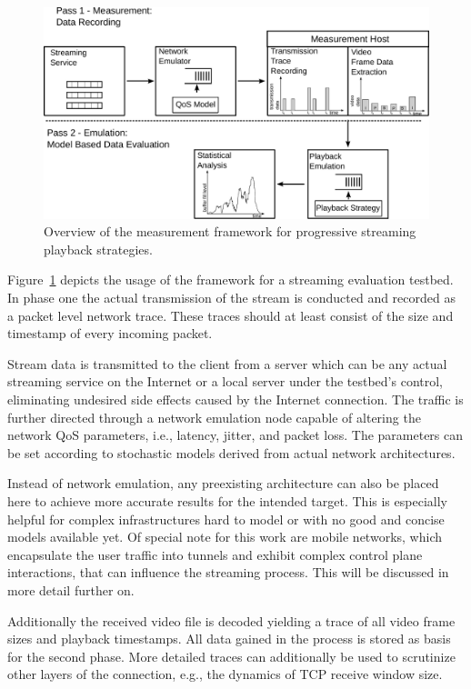 \begin{figure}[htb]
	\includegraphics[width=1.0\textwidth]{images/measurement-model.pdf}
	\caption{Overview of the measurement framework for progressive streaming playback strategies.}
\label{c3:fig:framework}
\end{figure}

Figure~\ref{c3:fig:framework} depicts the usage of the framework for a streaming evaluation testbed. In phase one the actual transmission of the stream is conducted and recorded as a packet level network trace. These traces should at least consist of the size and timestamp of every incoming packet.

Stream data is transmitted to the client from a server which can be any actual streaming service on the Internet or a local server under the testbed's control, eliminating undesired side effects caused by the Internet connection. The traffic is further directed through a network emulation node capable of altering the network \gls{QoS} parameters, i.e., latency, jitter, and packet loss. The parameters can be set according to stochastic models derived from actual network architectures. 

Instead of network emulation, any preexisting architecture can also be placed here to achieve more accurate results for the intended target. This is especially helpful for complex infrastructures hard to model or with no good and concise models available yet. Of special note for this work are mobile networks, which encapsulate the user traffic into tunnels and exhibit complex control plane interactions, that can influence the streaming process. This will be discussed in more detail further on.

Additionally the received video file is decoded yielding a trace of all video frame sizes and playback timestamps. All data gained in the process is stored as basis for the second phase. More detailed traces can additionally be used to scrutinize other layers of the connection, e.g., the dynamics of \gls{TCP} receive window size. 

